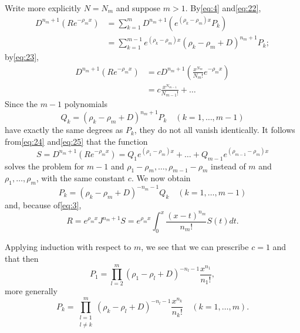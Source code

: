 Write more explicitly $N=N_m$ and suppose $m > 1$. By\eqref{eq:4} and\eqref{eq:22},
\begin{equation} \begin{aligned} D^{n_m+1}(Re^{-\rho_m x}) &= \sum_{k=1}^{m} D^{n_m+1}(e^{(\rho_k-\rho_m)x}P_k) \\ &= \sum_{k=1}^{m-1} e^{(\rho_k-\rho_m)x}(\rho_k-\rho_m+D)^{n_m+1}P_k; \end{aligned} \tag{24}\label{eq:24} \end{equation}
by\eqref{eq:23},
\begin{equation} \begin{aligned} D^{n_m+1}(Re^{-\rho_m x}) &= c D^{n_m+1}\left(\frac{x^{N_m}}{N_m!}e^{-\rho_m x}\right) \\ &= c\frac{x^{N_{m-1}}}{N_{m-1}!} + \dots \end{aligned} \tag{25}\label{eq:25} \end{equation}
Since the $m-1$ polynomials
\[ Q_k = (\rho_k - \rho_m + D)^{n_m+1} P_k \quad (k=1,\dots,m-1) \]
have exactly the same degrees as $P_k$, they do not all vanish identically. It follows from\eqref{eq:24} and\eqref{eq:25} that the function
\[ S = D^{n_m+1} (Re^{-\rho_m x}) = Q_1 e^{(\rho_1-\rho_m)x} + \dots + Q_{m-1} e^{(\rho_{m-1}-\rho_m)x} \]
solves the problem for $m-1$ and $\rho_1 - \rho_m, \ldots, \rho_{m-1} - \rho_m$ instead of $m$ and $\rho_1, \ldots, \rho_m$, with the same constant $c$. We now obtain
\[ P_k = (\rho_k - \rho_m + D)^{-n_m-1} Q_k \quad (k=1,\dots,m-1) \]
and, because of\eqref{eq:3},
\begin{equation} R = e^{\rho_m x} J^{n_m+1} S = e^{\rho_m x} \int_0^x \frac{(x-t)^{n_m}}{n_m!} S(t) dt. \tag{26}\label{eq:26} \end{equation}

Applying induction with respect to $m$, we see that we can prescribe $c=1$ and that then
\[ P_1 = \prod_{l=2}^{m} \left( \rho_1 - \rho_l + D \right)^{-n_l-1} \frac{x^{n_1}}{n_1!}, \]
more generally
\begin{equation} P_k = \prod_{\substack{l=1\\l \neq k}}^{m} (\rho_k - \rho_l + D)^{-n_l-1} \frac{x^{n_k}}{n_k!} \quad (k=1,\dots,m). \tag{27}\label{eq:27} \end{equation}

